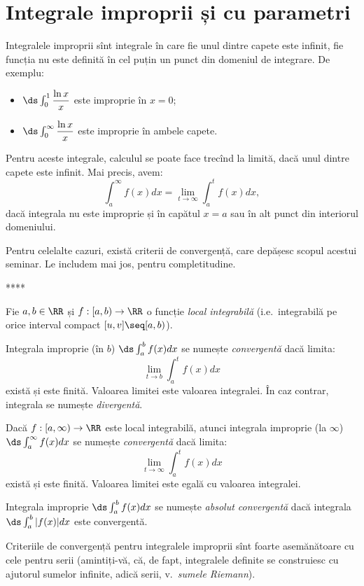 
\chapter{Integrale improprii și cu parametri}

Integralele improprii sînt integrale în care fie unul dintre capete este
infinit, fie funcția nu este definită în cel puțin un punct din domeniul
de integrare. De exemplu:
\begin{itemize}
    \item $ \ds\int_0^1 \dfrac{\ln x}{x} $ este improprie în $ x = 0 $;
    \item $ \ds\int_0^\infty \dfrac{\ln x}{x} $ este improprie în ambele capete.
\end{itemize}

Pentru aceste integrale, calculul se poate face trecînd la limită, dacă
unul dintre capete este infinit. Mai precis, avem:
\[
    \int_a^\infty f(x) dx = \lim_{t \to \infty} \int_a^t f(x) dx,
\]
dacă integrala nu este improprie și în capătul $ x = a $ sau în alt
punct din interiorul domeniului.

Pentru celelalte cazuri, există criterii de convergență, care
depășesc scopul acestui seminar. Le includem mai jos, pentru completitudine.

\begin{center}
    {\Large *****}
\end{center}

Fie $a, b \in \RR$ și $f : [a, b) \to \RR$ o funcție \emph{local integrabilă}
(i.e.\ integrabilă pe orice interval compact $[u, v] \seq [a, b)$).

Integrala improprie (în $b$) $\ds\int_a^b f(x) dx$ se numește \emph{convergentă}
dacă limita:
\[
  \lim_{t \to b} \int_a^t f(x) dx
\]
există și este finită. Valoarea limitei este valoarea integralei. În caz contrar,
integrala se numește \emph{divergentă}.

Dacă $f : [a, \infty) \to \RR$ este local integrabilă, atunci integrala
improprie (la $\infty$) $\ds\int_a^\infty f(x) dx$ se numește \emph{convergentă}
dacă limita:
\[
  \lim_{t \to \infty} \int_a^t f(x) dx
\]
există și este finită. Valoarea limitei este egală cu valoarea integralei.

Integrala improprie $\ds\int_a^b f(x) dx$ se numește \emph{absolut convergentă}
dacă integrala $\ds\int_a^b |f(x)| dx$ este convergentă.

Criteriile de convergență pentru integralele improprii sînt foarte asemănătoare
cu cele pentru serii (amintiți-vă, că, de fapt, integralele definite se construiesc
cu ajutorul sumelor infinite, adică serii, v.\ \emph{sumele Riemann}).

